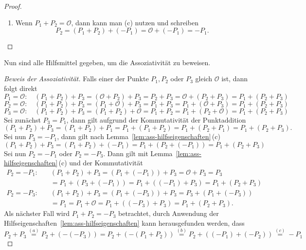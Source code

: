 \begin{proof}
\begin{enumerate}[label= (\alph*)]
              Ersetzt man $P_1$ durch $-P_1$, folgt mit Teil (a) und der Kommutativität
              \[
                  P_2=((-P_1)+P_2)+(-(-P_1))
                  =P_1+(P_2+(-P_1)).
              \]
              Damit gilt
              \[
                  (P_1+P_2)+(-P_1)=P_1+(P_2+(-P_1))=P_2.
              \]
        \item Wenn $P_1+P_2=\mathcal{O}$, dann kann man (c) nutzen und schreiben
              \[
                  P_2=(P_1+P_2)+(-P_1)=\mathcal{O}+(-P_1)=-P_1.
              \]
    \end{enumerate}
\end{proof}

Nun sind alle Hilfsmittel gegeben, um die Assoziativität zu beweisen.
\begin{proof}[Beweis der Assoziativität]
    Falls einer der Punkte $P_1,P_2$ oder $P_3$ gleich $\mathcal{O}$ ist, dann folgt direkt
    \[
        P_1=\mathcal{O}: \quad (P_1+P_2)+P_3=(\mathcal{O}+P_2)+P_3=P_2+P_3 = \mathcal{O}+(P_2+P_3)=P_1+(P_2+P_3)
    \]
    \[
        P_2=\mathcal{O}: \quad (P_1+P_2)+P_3=(P_1+\mathcal{O})+P_3 =P_1+P_3 = P_1+(\mathcal{O}+P_3)=P_1+(P_2+P_3)
    \]
    \[
        P_3=\mathcal{O}: \quad (P_1+P_2)+P_3=(P_1+P_2)+\mathcal{O} =P_1+P_2 = P_1+(P_2+\mathcal{O})=P_1+(P_2+P_3)
    \]
    Sei zunächst $P_3=P_1$, dann gilt aufgrund der Kommutativität der Punktaddition
    \[
        (P_1+P_2)+P_3=(P_1+P_2)+P_1=P_1+(P_1+P_2)=P_1+(P_2+P_1)=P_1+(P_2+P_3).
    \]
    Sei nun $P_3=-P_1$, dann gilt nach Lemma~\ref{lem:ass-hilfseigenschaften}\,(c)
    \[
        (P_1+P_2)+P_3 = (P_1+P_2)+(-P_1)=P_1+(P_2+(-P_1))=P_1+(P_2+P_3)
    \]
    Sei nun $P_2=-P_1$ oder $P_2=-P_3$. Dann gilt mit Lemma~\ref{lem:ass-hilfseigenschaften}\,(c) und der Kommutativität
    \begin{align*}
        P_2=-P_1:\quad & (P_1+P_2)+P_3
        = (P_1+(-P_1))+P_3=\mathcal{O}+P_3=P_3                                   \\
                       & = P_1+(P_3+(-P_1))=P_1+((-P_1)+P_3)=P_1+(P_2+P_3)       \\
        P_2=-P_3:\quad & (P_1+P_2)+P_3
        = (P_1+(-P_3))+P_3=P_3+(P_1+(-P_3))                                      \\
                       & = P_1 = P_1+\mathcal{O}=P_1+((-P_3)+P_3)=P_1+(P_2+P_3).
    \end{align*}
    Als nächster Fall wird $P_1+P_2=-P_3$ betrachtet, durch Anwendung der Hilfseigenschaften~\ref{lem:ass-hilfseigenschaften} kann herausgefunden werden, dass
    \[
        P_2+P_3\overset{(a)}{=}P_2+(-(-P_3))=P_2+(-(P_1+P_2))\overset{(b)}{=}P_2+((-P_1)+(-P_2))\overset{(c)}{=}-P_1
\]
\end{proof}
